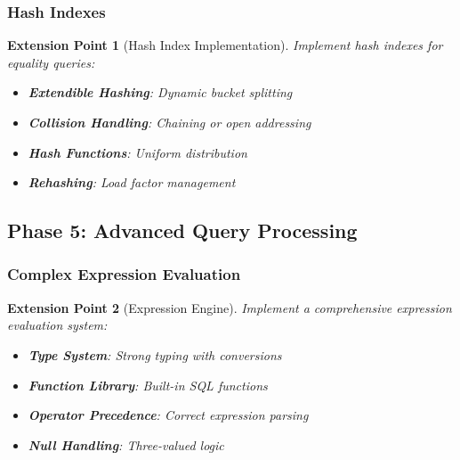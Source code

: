 \documentclass[12pt,a4paper]{article}
\newtheorem{extension}{Extension Point}[section]
\begin{document}
    \subsubsection{Hash Indexes}

    \begin{extension}[Hash Index Implementation]
        Implement hash indexes for equality queries:

        \begin{itemize}
            \item \textbf{Extendible Hashing}: Dynamic bucket splitting
            \item \textbf{Collision Handling}: Chaining or open addressing
            \item \textbf{Hash Functions}: Uniform distribution
            \item \textbf{Rehashing}: Load factor management
        \end{itemize}
    \end{extension}

    \subsection{Phase 5: Advanced Query Processing}

    \subsubsection{Complex Expression Evaluation}

    \begin{extension}[Expression Engine]
        Implement a comprehensive expression evaluation system:

        \begin{itemize}
            \item \textbf{Type System}: Strong typing with conversions
            \item \textbf{Function Library}: Built-in SQL functions
            \item \textbf{Operator Precedence}: Correct expression parsing
            \item \textbf{Null Handling}: Three-valued logic
        \end{itemize}
    \end{extension}
\end{document}
